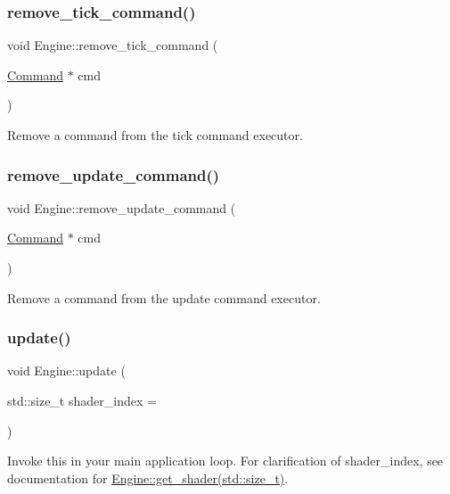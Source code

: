 \subsubsection{\texorpdfstring{remove\+\_\+tick\+\_\+command()}{remove\_tick\_command()}}
{\footnotesize\ttfamily void Engine\+::remove\+\_\+tick\+\_\+command (\begin{DoxyParamCaption}\item[{\mbox{\hyperlink{class_command}{Command}} $\ast$}]{cmd }\end{DoxyParamCaption})}

Remove a command from the tick command executor. \mbox{\label{class_engine_ad02b6f115de1ce69088c5784cc937d04}} 
\subsubsection{\texorpdfstring{remove\+\_\+update\+\_\+command()}{remove\_update\_command()}}
{\footnotesize\ttfamily void Engine\+::remove\+\_\+update\+\_\+command (\begin{DoxyParamCaption}\item[{\mbox{\hyperlink{class_command}{Command}} $\ast$}]{cmd }\end{DoxyParamCaption})}

Remove a command from the update command executor. \mbox{\label{class_engine_a12375001d456a8beb1b51c5f97ad6c22}} 
\subsubsection{\texorpdfstring{update()}{update()}}
{\footnotesize\ttfamily void Engine\+::update (\begin{DoxyParamCaption}\item[{std\+::size\+\_\+t}]{shader\+\_\+index = {} }\end{DoxyParamCaption})}

Invoke this in your main application loop. For clarification of \textquotesingle{}shader\+\_\+index\textquotesingle{}, see documentation for \mbox{\hyperlink{class_engine_af92650e3ce3cabf7e527c92ae4917702}{Engine\+::get\+\_\+shader(std\+::size\+\_\+t)}}. 

